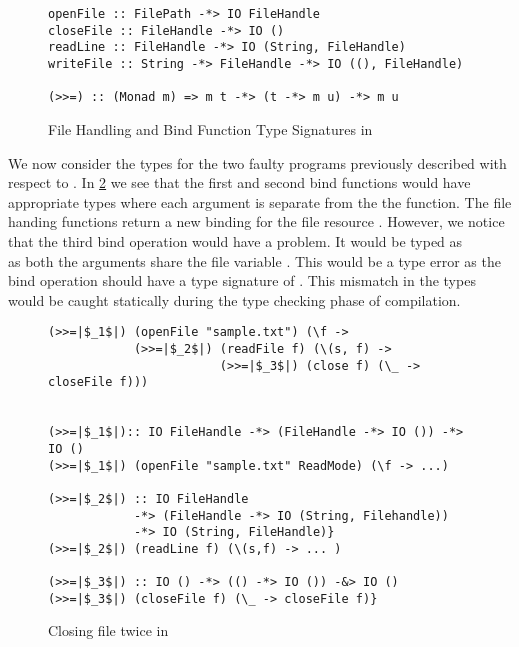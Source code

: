\begin{figure}[h]
  \begin{framed}
    \begin{verbatim}
openFile :: FilePath -*> IO FileHandle
closeFile :: FileHandle -*> IO ()
readLine :: FileHandle -*> IO (String, FileHandle)
writeFile :: String -*> FileHandle -*> IO ((), FileHandle)

(>>=) :: (Monad m) => m t -*> (t -*> m u) -*> m u
    \end{verbatim}
  \end{framed}
  \caption{File Handling and Bind Function Type Signatures in \qub{}}
  \label{fig:qub-file-handling-functions}
\end{figure}

We now consider the types for the two faulty programs previously described with respect to \qub{}.
In \cref{fig:qub-close-file-twice} we see that the first 
and second bind  functions would have appropriate types
where each argument is separate from the the function. The file handing functions
return a new binding for the file resource . However, we notice that the third bind operation
 would have a problem. It would be typed as
\\
as both the arguments share the file variable . This would be a type error
as the bind operation should have a type signature of .
This mismatch in the types would be caught statically during the type checking phase of compilation.

\begin{figure}[h]
\begin{framed}
\begin{verbatim}
(>>=|$_1$|) (openFile "sample.txt") (\f ->
            (>>=|$_2$|) (readFile f) (\(s, f) ->
                        (>>=|$_3$|) (close f) (\_ -> closeFile f)))


(>>=|$_1$|):: IO FileHandle -*> (FileHandle -*> IO ()) -*> IO ()
(>>=|$_1$|) (openFile "sample.txt" ReadMode) (\f -> ...)

(>>=|$_2$|) :: IO FileHandle
            -*> (FileHandle -*> IO (String, Filehandle))
            -*> IO (String, FileHandle)}
(>>=|$_2$|) (readLine f) (\(s,f) -> ... )

(>>=|$_3$|) :: IO () -*> (() -*> IO ()) -&> IO ()
(>>=|$_3$|) (closeFile f) (\_ -> closeFile f)}
\end{verbatim}
\end{framed}
\caption{Closing file twice in \qub{}}
\label{fig:qub-close-file-twice}
\end{figure}

